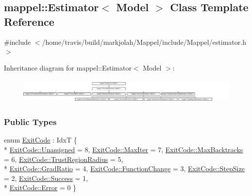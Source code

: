 \hypertarget{classmappel_1_1Estimator}{}\subsection{mappel\+:\+:Estimator$<$ Model $>$ Class Template Reference}
\label{classmappel_1_1Estimator}


{\ttfamily \#include $<$/home/travis/build/markjolah/\+Mappel/include/\+Mappel/estimator.\+h$>$}

Inheritance diagram for mappel\+:\+:Estimator$<$ Model $>$\+:\begin{figure}[H]
\begin{center}
\leavevmode
\includegraphics[height=1.274175cm]{classmappel_1_1Estimator}
\end{center}
\end{figure}
\subsubsection*{Public Types}
\begin{DoxyCompactItemize}
\item 
enum \hyperlink{classmappel_1_1Estimator_a6d599915907ba4d0607fcb958d231edc}{Exit\+Code} \+: IdxT \{ \\*
\hyperlink{classmappel_1_1Estimator_a6d599915907ba4d0607fcb958d231edca3476bf9c3af766198bfbd4f065a51e69}{Exit\+Code\+::\+Unassigned} = 8, 
\hyperlink{classmappel_1_1Estimator_a6d599915907ba4d0607fcb958d231edcabbf52264f7a6e91c48a242f95aeed3db}{Exit\+Code\+::\+Max\+Iter} = 7, 
\hyperlink{classmappel_1_1Estimator_a6d599915907ba4d0607fcb958d231edca9e5d3183756d69b44432394db6b6fd86}{Exit\+Code\+::\+Max\+Backtracks} = 6, 
\hyperlink{classmappel_1_1Estimator_a6d599915907ba4d0607fcb958d231edcaadd208e6fbd6ef5ab84a287f259c3b81}{Exit\+Code\+::\+Trust\+Region\+Radius} = 5, 
\\*
\hyperlink{classmappel_1_1Estimator_a6d599915907ba4d0607fcb958d231edca8d0cc41d71102a7952fefe3c63244fd4}{Exit\+Code\+::\+Grad\+Ratio} = 4, 
\hyperlink{classmappel_1_1Estimator_a6d599915907ba4d0607fcb958d231edca8d75b053f108781c02ac7c22facc4338}{Exit\+Code\+::\+Function\+Change} = 3, 
\hyperlink{classmappel_1_1Estimator_a6d599915907ba4d0607fcb958d231edca071449462d0c247e47313eb8c3129dd0}{Exit\+Code\+::\+Step\+Size} = 2, 
\hyperlink{classmappel_1_1Estimator_a6d599915907ba4d0607fcb958d231edca505a83f220c02df2f85c3810cd9ceb38}{Exit\+Code\+::\+Success} = 1, 
\\*
\hyperlink{classmappel_1_1Estimator_a6d599915907ba4d0607fcb958d231edca902b0d55fddef6f8d651fe1035b7d4bd}{Exit\+Code\+::\+Error} = 0
 \}
\end{DoxyCompactItemize}

